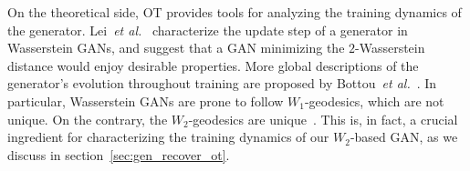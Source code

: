 \documentclass[runningheads]{llncs}
\newcommand\mycitet[1]{\cite{#1}}
\begin{document}

On the theoretical side, OT provides tools for analyzing the training dynamics of the generator. Lei~\emph{et al.}~\mycitet{Lei2017AGV} characterize the update step of a generator in Wasserstein GANs, and suggest that a GAN minimizing the $2$-Wasserstein distance would enjoy desirable properties. More global descriptions of the generator's evolution throughout training are proposed by Bottou~\emph{et al.}~\mycitet{bottou2018geometrical}. In particular, Wasserstein GANs are prone to follow $W_1$-geodesics, which are not unique. On the contrary, the $W_2$-geodesics are unique~\citep{Villani,ambrosio2008gradient}. This is, in fact, a crucial ingredient for characterizing the training dynamics of our $W_2$-based GAN, as we discuss in section~\ref{sec:gen_recover_ot}.
\end{document}
